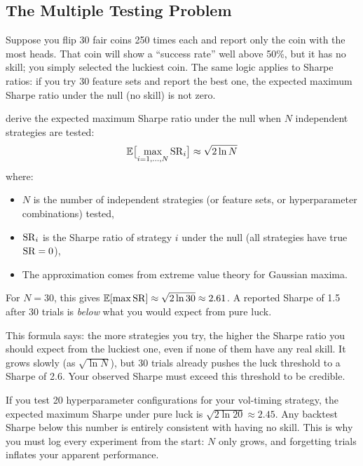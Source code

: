 \subsection{The Multiple Testing Problem}

\begin{intuition}
Suppose you flip 30 fair coins 250 times each and report only the coin with the most heads.
That coin will show a ``success rate'' well above 50\%, but it has no skill; you simply selected the luckiest coin.
The same logic applies to Sharpe ratios: if you try 30 feature sets and report the best one, the expected maximum Sharpe ratio under the null (no skill) is not zero.
\end{intuition}

\citet{Bailey2014DSR} derive the expected maximum Sharpe ratio under the null when $N$ independent strategies are tested:
\begin{equation}
\label{eq:expected-max-sr}
\mathbb{E}\bigl[\max_{i=1,\ldots,N} \operatorname{SR}_i\bigr] \approx \sqrt{2 \ln N}
\end{equation}
where:
\begin{itemize}[nosep]
  \item $N$ is the number of independent strategies (or feature sets, or hyperparameter combinations) tested,
  \item $\operatorname{SR}_i$ is the Sharpe ratio of strategy $i$ under the null (all strategies have true $\operatorname{SR} = 0$),
  \item The approximation comes from extreme value theory for Gaussian maxima.
\end{itemize}

For $N = 30$, this gives $\mathbb{E}[\max \operatorname{SR}] \approx \sqrt{2 \ln 30} \approx 2.61$.
A reported Sharpe of 1.5 after 30 trials is \emph{below} what you would expect from pure luck.

\begin{intuition}
This formula says: the more strategies you try, the higher the Sharpe ratio you should expect from the luckiest one, even if none of them have any real skill.
It grows slowly (as $\sqrt{\ln N}$), but 30 trials already pushes the luck threshold to a Sharpe of 2.6.
Your observed Sharpe must exceed this threshold to be credible.
\end{intuition}

\begin{projectconnection}
If you test 20 hyperparameter configurations for your vol-timing strategy, the expected maximum Sharpe under pure luck is $\sqrt{2 \ln 20} \approx 2.45$.
Any backtest Sharpe below this number is entirely consistent with having no skill.
This is why you must log every experiment from the start: $N$ only grows, and forgetting trials inflates your apparent performance.
\end{projectconnection}

